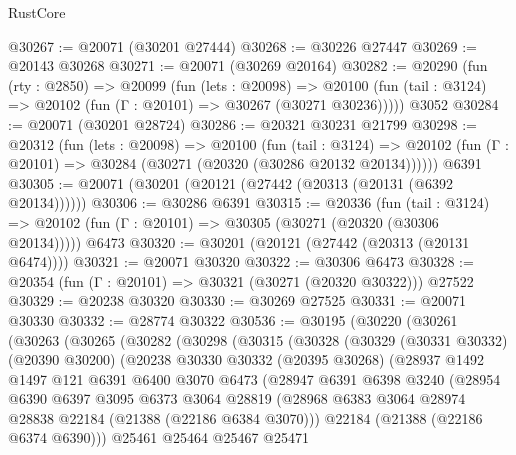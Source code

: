 \begin{lexlean}{RustCore}
\begin{coremodule}
@30267 := @20071 (@30201 @27444)
@30268 := @30226 @27447
@30269 := @20143 @30268
@30271 := @20071 (@30269 @20164)
@30282 := @20290
    (fun (rty : @2850) =>
    @20099
      (fun (lets : @20098) =>
      @20100 (fun (tail : @3124) => @20102 (fun (Γ : @20101) => @30267 (@30271 @30236)))))
    @3052
@30284 := @20071 (@30201 @28724)
@30286 := @20321 @30231 @21799
@30298 := @20312
    (fun (lets : @20098) =>
    @20100
      (fun (tail : @3124) =>
      @20102 (fun (Γ : @20101) => @30284 (@30271 (@20320 (@30286 @20132 @20134))))))
    @6391
@30305 := @20071 (@30201 (@20121 (@27442 (@20313 (@20131 (@6392 @20134))))))
@30306 := @30286 @6391
@30315 := @20336
    (fun (tail : @3124) => @20102 (fun (Γ : @20101) => @30305 (@30271 (@20320 (@30306 @20134)))))
    @6473
@30320 := @30201 (@20121 (@27442 (@20313 (@20131 @6474))))
@30321 := @20071 @30320
@30322 := @30306 @6473
@30328 := @20354 (fun (Γ : @20101) => @30321 (@30271 (@20320 @30322))) @27522
@30329 := @20238 @30320
@30330 := @30269 @27525
@30331 := @20071 @30330
@30332 := @28774 @30322
@30536 := @30195
    (@30220
      (@30261
        (@30263
          (@30265
            (@30282
              (@30298
                (@30315
                  (@30328
                    (@30329
                      (@30331 @30332)
                      (@20390 @30200)
                      (@20238
                        @30330
                        @30332
                        (@20395 @30268)
                        (@28937
                          @1492
                          @1497
                          @121
                          @6391
                          @6400
                          @3070
                          @6473
                          (@28947
                            @6391
                            @6398
                            @3240
                            (@28954
                              @6390
                              @6397
                              @3095
                              @6373
                              @3064
                              @28819
                              (@28968
                                @6383
                                @3064
                                @28974
                                @28838
                                @22184
                                (@21388 (@22186 @6384 @3070)))
                              @22184
                              (@21388 (@22186 @6374 @6390)))
                            @25461
                            @25464
                            @25467
                            @25471

\end{coremodule}
\end{lexlean}
